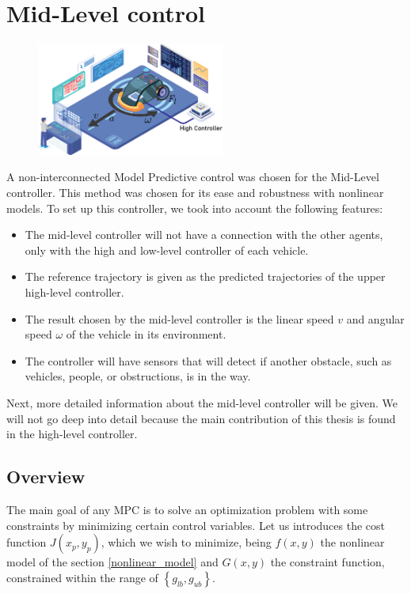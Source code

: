 \section{Mid-Level control}
 
 \begin{figure}[H]
\centering
    \includegraphics[width=0.55\textwidth]{Kap3/control_model.png}
\end{figure}
 
A non-interconnected Model Predictive control was chosen for the Mid-Level controller. This method was chosen for its ease and robustness with nonlinear models. To set up this controller, we took into account the following features:
\begin{itemize}
    \item The mid-level controller will not have a connection with the other agents, only with the high and low-level controller of each vehicle.
    \item The reference trajectory is given as the predicted trajectories of the upper high-level controller.
    \item The result chosen by the mid-level controller is the linear speed $v$ and angular speed $\omega$ of the vehicle in its environment.
    \item The controller will have sensors that will detect if another obstacle, such as vehicles, people, or obstructions, is in the way.
\end{itemize}

Next, more detailed information about the mid-level controller will be given. We will not go deep into detail because the main contribution of this thesis is found in the high-level controller.

\subsection{Overview} 
 
The main goal of any MPC is to solve an optimization problem with some constraints by minimizing certain control variables. Let us introduces the cost function $J( x_p, y_p )$, which we wish to minimize, being $f(x,y)$ the nonlinear model of the section \ref{nonlinear_model} and $G(x,y)$ the constraint function, constrained within the range of $\left\{ g_{lb}, g_{ub} \right\}$.
 
